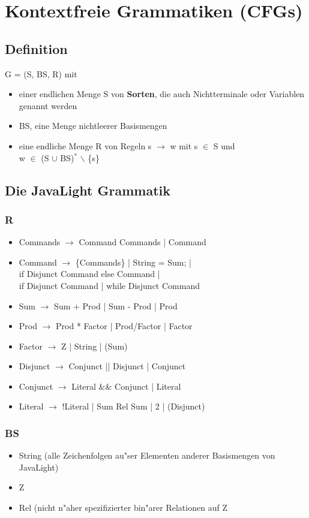 \documentclass[11pt]{article}
\begin{document}
\section{Kontextfreie Grammatiken (CFGs)}
\label{sec-4}

\subsection{Definition}
\label{sec-4-1}
G = (S, BS, R) mit 

\begin{itemize}
\item einer endlichen Menge S von \textbf{Sorten}, die auch Nichtterminale oder Variablen genannt werden
\item BS, eine Menge nichtleerer Basismengen
\item eine endliche Menge R von Regeln s $\to$ w mit s $\in$ S und \\ w $\in$ (S $\cup$ BS)$^{\text{*}}$ $\backslash$ \{s\}
\end{itemize}

\subsection{Die JavaLight Grammatik}
\label{sec-4-2}
\subsubsection{R}
\label{sec-4-2-1}
\begin{itemize}
\item Commands $\to$ Command Commands | Command
\item Command $\to$ \{Commands\} | String = Sum; | \\ if Disjunct Command else Command | \\ if Disjunct Command | while Disjunct Command
\item Sum $\to$ Sum + Prod | Sum - Prod | Prod
\item Prod $\to$ Prod * Factor | Prod/Factor | Factor
\item Factor $\to$ Z | String | (Sum)
\item Disjunct $\to$ Conjunct || Disjunct | Conjunct
\item Conjunct $\to$ Literal \&\& Conjunct | Literal
\item Literal $\to$ !Literal | Sum Rel Sum | 2 | (Disjunct)
\end{itemize}

\subsubsection{BS}
\label{sec-4-2-2}
\begin{itemize}
\item String (alle Zeichenfolgen au"ser Elementen anderer Basismengen von JavaLight)
\item Z
\item Rel (nicht n"aher spezifizierter bin"arer Relationen auf Z
\end{itemize}
\end{document}
